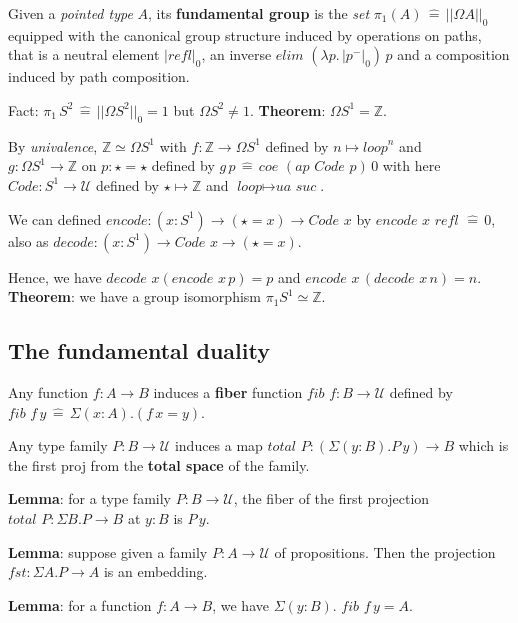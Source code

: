\documentclass[a4paper]{article}
\begin{document}
Given a \textit{pointed type} $A$, its \textbf{fundamental group} is the \textit{set} $\pi_1(A) \, \hat{=} \, || \Omega A ||_0$ equipped with the canonical group structure induced by operations on paths, that is a neutral element $|\textit{refl}|_0$, an inverse $\textit{elim } (\lambda p. \, |p^-|_0) \, p$ and a composition induced by path composition.

Fact: $\pi_1 \, S^2 \, \hat{=} \, || \Omega S^2 ||_0 = 1$ but $\Omega S^2 \bm{\neq} 1$. \textbf{Theorem}: $\Omega S^1 = \mathbb{Z}$.

By \textit{univalence}, $\mathbb{Z} \simeq \Omega S^1$ with $f : \mathbb{Z} \to \Omega S^1$ defined by $n \mapsto \textit{loop}^n$ and $g : \Omega S^1 \to \mathbb{Z} \text{ on } p : \star = \star$ defined by $g \, p \, \hat{=} \, \textit{coe } (\textit{ap } \textit{Code } p) \, 0$ with here $\textit{Code} : S^1 \to \mathcal{U}$ defined by $\star \mapsto \mathbb{Z}$ and $\textit{loop} \mapsto \textit{ua suc}$.

We can defined $\textit{encode} : (x : S^1) \to (\star = x) \to \textit{Code } x$ by $\textit{encode } x \textit{ refl } \hat{=} \, 0$, also as $\textit{decode} : (x : S^1) \to \textit{Code } x \to (\star = x)$.

Hence, we have $\textit{decode } x (\textit{encode } x \, p) = p$ and $\textit{encode } x \, (\textit{decode } x \, n) = n$. \textbf{Theorem}: we have a group isomorphism $\pi_1 S^1 \simeq \mathbb{Z}$.

\subsection*{The fundamental duality}

Any function $f : A \to B$ induces a \textbf{fiber} function $\textit{fib } f : B \to \mathcal{U}$ defined by $\textit{fib } f \, y \, \hat{=} \, \Sigma(x : A).(f \, x = y)$.

Any type family $P : B \to \mathcal{U}$ induces a map $\textit{total } P : (\Sigma(y : B). P \, y) \to B$ which is the first proj from the \textbf{total space} of the family.

\textbf{Lemma}: for a type family $P : B \to \mathcal{U}$, the fiber of the first projection $\textit{total } P : \Sigma B. P \to B$ at $y : B$ is $P \, y$.

\textbf{Lemma}: suppose given a family $P : A \to \mathcal{U}$ of propositions. Then the projection $\textit{fst} : \Sigma A. P \to A$ is an embedding.

\textbf{Lemma}: for a function $f : A \to B$, we have $\Sigma (y : B). \textit{ fib } f \, y = A$.
\end{document}
